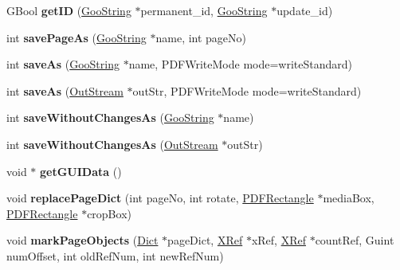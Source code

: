 \begin{DoxyCompactItemize}
G\+Bool {\bfseries get\+ID} (\hyperlink{class_goo_string}{Goo\+String} $\ast$permanent\+\_\+id, \hyperlink{class_goo_string}{Goo\+String} $\ast$update\+\_\+id)
\item 
\mbox{\label{class_p_d_f_doc_afb98271fbf675bf3e1f840608822f170}} 
int {\bfseries save\+Page\+As} (\hyperlink{class_goo_string}{Goo\+String} $\ast$name, int page\+No)
\item 
\mbox{\label{class_p_d_f_doc_a76625f3fb2c279a08d6fb5c7eff06f83}} 
int {\bfseries save\+As} (\hyperlink{class_goo_string}{Goo\+String} $\ast$name, P\+D\+F\+Write\+Mode mode=write\+Standard)
\item 
\mbox{\label{class_p_d_f_doc_ab2f84a7b5439d9c36b64bfc675e9c054}} 
int {\bfseries save\+As} (\hyperlink{class_out_stream}{Out\+Stream} $\ast$out\+Str, P\+D\+F\+Write\+Mode mode=write\+Standard)
\item 
\mbox{\label{class_p_d_f_doc_a521f25d21c62a32a2a58ebcad73b728c}} 
int {\bfseries save\+Without\+Changes\+As} (\hyperlink{class_goo_string}{Goo\+String} $\ast$name)
\item 
\mbox{\label{class_p_d_f_doc_afe57ebf6a89584509245b11b5bdfe137}} 
int {\bfseries save\+Without\+Changes\+As} (\hyperlink{class_out_stream}{Out\+Stream} $\ast$out\+Str)
\item 
\mbox{\label{class_p_d_f_doc_ac60622bfb95e87d99f3922d5af213c14}} 
void $\ast$ {\bfseries get\+G\+U\+I\+Data} ()
\item 
\mbox{\label{class_p_d_f_doc_a7c00bb8c503595b74a9222e2de48b0fc}} 
void {\bfseries replace\+Page\+Dict} (int page\+No, int rotate, \hyperlink{class_p_d_f_rectangle}{P\+D\+F\+Rectangle} $\ast$media\+Box, \hyperlink{class_p_d_f_rectangle}{P\+D\+F\+Rectangle} $\ast$crop\+Box)
\item 
\mbox{\label{class_p_d_f_doc_a33701d82b9801a3cb711717ad5440545}} 
void {\bfseries mark\+Page\+Objects} (\hyperlink{class_dict}{Dict} $\ast$page\+Dict, \hyperlink{class_x_ref}{X\+Ref} $\ast$x\+Ref, \hyperlink{class_x_ref}{X\+Ref} $\ast$count\+Ref, Guint num\+Offset, int old\+Ref\+Num, int new\+Ref\+Num)

\end{DoxyCompactItemize}
